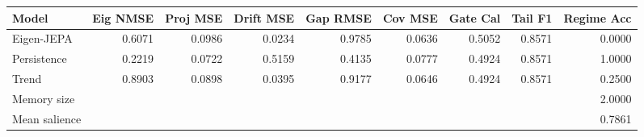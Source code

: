 \begin{tabular}{lrrrrrrrr}
\toprule
Model & Eig NMSE & Proj MSE & Drift MSE & Gap RMSE & Cov MSE & Gate Cal & Tail F1 & Regime Acc \\
\midrule
Eigen-JEPA & 0.6071 & 0.0986 & 0.0234 & 0.9785 & 0.0636 & 0.5052 & 0.8571 & 0.0000 \\
Persistence & 0.2219 & 0.0722 & 0.5159 & 0.4135 & 0.0777 & 0.4924 & 0.8571 & 1.0000 \\
Trend & 0.8903 & 0.0898 & 0.0395 & 0.9177 & 0.0646 & 0.4924 & 0.8571 & 0.2500 \\
\midrule
Memory size & \multicolumn{8}{r}{2.0000} \\
Mean salience & \multicolumn{8}{r}{0.7861} \\
\bottomrule
\end{tabular}